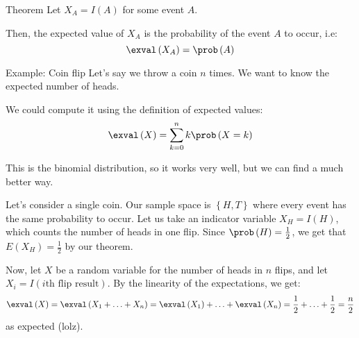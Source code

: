 \documentclass[a4paper]{article}
\begin{document}
\begin{parag}{Theorem}
    Let $X_A = I\left(A\right)$ for some event $A$.

    Then, the expected value of $X_A$ is the probability of the event $A$ to occur, i.e:
    \[\exval\left(X_A\right) = \prob\left(A\right)\]
\end{parag}


\begin{parag}{Example: Coin flip}
    Let's say we throw a coin $n$ times. We want to know the expected number of heads.

    We could compute it using the definition of expected values: 
    \[\exval\left(X\right) = \sum_{k=0}^{n} k \prob\left(X = k\right)\]
    
    This is the binomial distribution, so it works very well, but we can find a much better way.

    Let's consider a single coin. Our sample space is $\left\{H, T\right\}$ where every event has the same probability to occur. Let us take an indicator variable $X_H = I\left(H\right)$, which counts the number of heads in one flip. Since $\prob\left(H\right) = \frac{1}{2}$, we get that $E\left(X_H\right) = \frac{1}{2}$ by our theorem. 

    Now, let $X$ be a random variable for the number of heads in $n$ flips, and let $X_i = I\left(\text{$i$th flip result}\right)$. By the linearity of the expectations, we get: 
    \[\exval\left(X\right) = \exval\left(X_1 + \ldots + X_n\right) = \exval\left(X_1\right) + \ldots + \exval\left(X_n\right) = \frac{1}{2} + \ldots + \frac{1}{2} = \frac{n}{2}\]
    as expected (lolz).
\end{parag}
\end{document}
